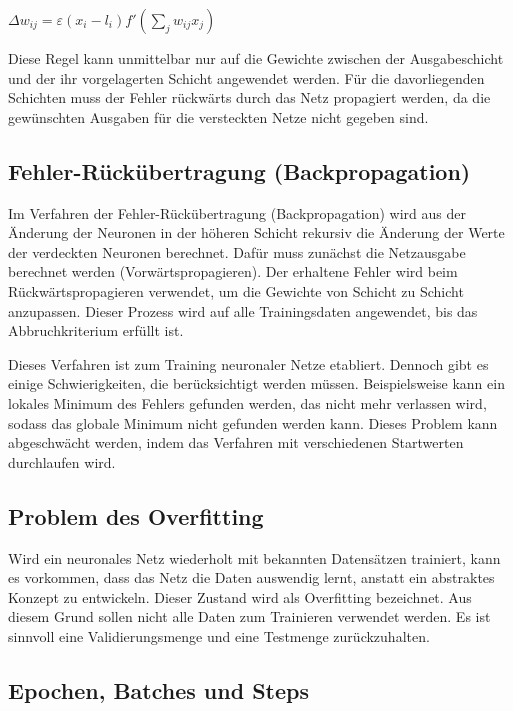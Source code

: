 \begin{center}
$\Delta w_{ij} = \varepsilon  (x_i - l_i)  f'(\sum_{j} w_{ij} x_j) $
\end{center}

Diese Regel kann unmittelbar nur auf die Gewichte zwischen der Ausgabeschicht und der ihr vorgelagerten Schicht angewendet 
werden. Für die davorliegenden Schichten muss der Fehler rückwärts durch das Netz propagiert werden, 
da die gewünschten Ausgaben für die versteckten Netze nicht gegeben sind. \cite{Kruse:2015} \\

\subsection{Fehler-Rückübertragung (Backpropagation)} 
Im Verfahren der Fehler-Rückübertragung (Backpropagation) wird aus der Änderung der Neuronen in der höheren 
Schicht rekursiv die Änderung der Werte der verdeckten Neuronen berechnet. Dafür muss zunächst die Netzausgabe 
berechnet werden (Vorwärtspropagieren). Der erhaltene Fehler wird beim Rückwärtspropagieren verwendet, um die 
Gewichte von Schicht zu Schicht anzupassen. Dieser Prozess wird auf alle Trainingsdaten angewendet, 
bis das Abbruchkriterium erfüllt ist. \cite{Ertel:2016}

Dieses Verfahren ist zum Training neuronaler Netze etabliert. Dennoch gibt es einige Schwierigkeiten, 
die berücksichtigt werden müssen. Beispielsweise kann ein lokales Minimum des Fehlers gefunden werden, 
das nicht mehr verlassen wird, sodass das globale Minimum nicht gefunden werden kann. Dieses Problem kann 
abgeschwächt werden, indem das Verfahren mit verschiedenen Startwerten durchlaufen wird. \cite{Kruse:2015}
	
\subsection{Problem des Overfitting}

Wird ein neuronales Netz wiederholt mit bekannten Datensätzen trainiert, kann es vorkommen, 
dass das Netz die Daten auswendig lernt, anstatt ein abstraktes Konzept zu
entwickeln. Dieser Zustand wird als Overfitting bezeichnet. Aus diesem Grund sollen nicht
alle Daten zum Trainieren verwendet werden. Es ist sinnvoll eine Validierungsmenge und
eine Testmenge zurückzuhalten. \cite{Becker:2018}

	
	
\subsection{Epochen, Batches und Steps}

